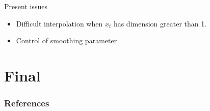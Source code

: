\documentclass[11pt]{beamer}
\begin{document}
\begin{frame}{Present issues}

\begin{itemize}

\item
Difficult interpolation when \(x_t\) has dimension greater than 1.
\item
Control of smoothing parameter
\end{itemize}

\end{frame}

\section{Final}\label{final}



\begin{frame}[allowframebreaks]
        \tiny
        \frametitle{References}
        
          
\end{frame}
\end{document}
